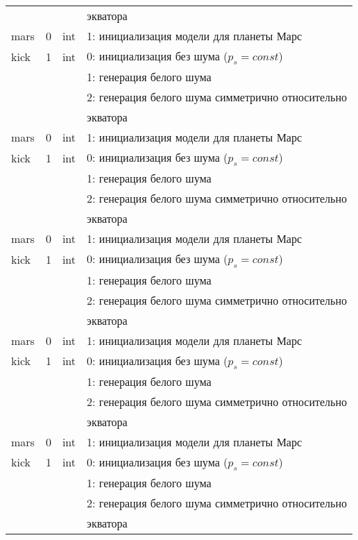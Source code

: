\begin{longtable}[c]{|l|c|l|l|}
      & & & экватора    \\
     mars & 0 & int & 1: инициализация модели для планеты Марс     \\
    kick & 1 & int & 0: инициализация без шума (\(p_s = const\)) \\
          &   &     & 1: генерация белого шума                  \\
          &   &     & 2: генерация белого шума симметрично относительно \\
      & & & экватора    \\
     mars & 0 & int & 1: инициализация модели для планеты Марс     \\
    kick & 1 & int & 0: инициализация без шума (\(p_s = const\)) \\
          &   &     & 1: генерация белого шума                  \\
          &   &     & 2: генерация белого шума симметрично относительно \\
      & & & экватора    \\
     mars & 0 & int & 1: инициализация модели для планеты Марс     \\
    kick & 1 & int & 0: инициализация без шума (\(p_s = const\)) \\
          &   &     & 1: генерация белого шума                  \\
          &   &     & 2: генерация белого шума симметрично относительно \\
      & & & экватора    \\
     mars & 0 & int & 1: инициализация модели для планеты Марс     \\
    kick & 1 & int & 0: инициализация без шума (\(p_s = const\)) \\
          &   &     & 1: генерация белого шума                  \\
          &   &     & 2: генерация белого шума симметрично относительно \\
      & & & экватора    \\
     mars & 0 & int & 1: инициализация модели для планеты Марс     \\
    kick & 1 & int & 0: инициализация без шума (\(p_s = const\)) \\
          &   &     & 1: генерация белого шума                  \\
          &   &     & 2: генерация белого шума симметрично относительно \\
      & & & экватора    \\

\end{longtable}
